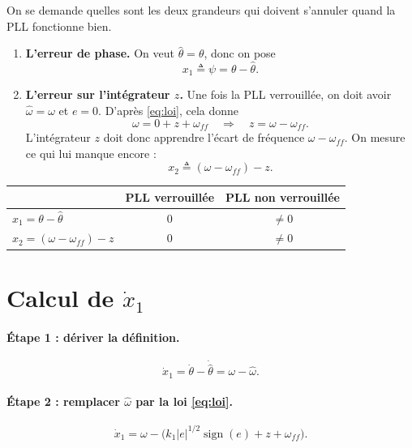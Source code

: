 \documentclass[11pt,a4paper]{article}
\newcommand{\sign}{\operatorname{sign}}
\newcommand{\hth}{\hat{\theta}}
\newcommand{\hw}{\hat{\omega}}
\begin{document}
On se demande quelles sont les deux grandeurs qui doivent s'annuler quand la PLL fonctionne bien.

\begin{enumerate}
  \item \textbf{L'erreur de phase.} On veut $\hth = \theta$, donc on pose
  \begin{equation}
  \boxed{x_1 \triangleq \psi = \theta - \hth .}
  \end{equation}

  \item \textbf{L'erreur sur l'intégrateur $z$.} Une fois la PLL verrouillée, on doit avoir $\hw=\omega$
  et $e=0$. D'après \eqref{eq:loi}, cela donne
  \[
  \omega = 0 + z + \omega_{ff} \quad\Longrightarrow\quad z = \omega - \omega_{ff}.
  \]
  L'intégrateur $z$ doit donc apprendre l'écart de fréquence $\omega-\omega_{ff}$.
  On mesure ce qui lui manque encore :
  \begin{equation}
  \boxed{x_2 \triangleq (\omega - \omega_{ff}) - z .}
  \end{equation}
\end{enumerate}

\begin{center}
\begin{tabular}{lcc}
\hline
 & PLL verrouillée & PLL non verrouillée \\
\hline
$x_1 = \theta-\hth$ & $0$ & $\neq 0$ \\
$x_2 = (\omega-\omega_{ff})-z$ & $0$ & $\neq 0$ \\
\hline
\end{tabular}
\end{center}

\section{Calcul de $\dot x_1$}

\paragraph{Étape 1 : dériver la définition.}
\begin{equation}
\dot x_1 = \dot\theta - \dot{\hth} = \omega - \hw .
\end{equation}

\paragraph{Étape 2 : remplacer $\hw$ par la loi \eqref{eq:loi}.}
\begin{equation}
\dot x_1 = \omega - \Big(k_1|e|^{1/2}\sign(e) + z + \omega_{ff}\Big).
\end{equation}
\end{document}
